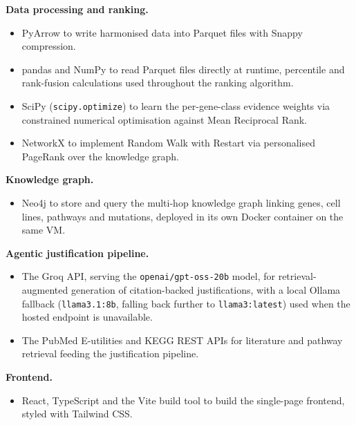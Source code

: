 \documentclass[author={Karen Coutinho, Ishaan Bhalla, Aman Raj, Dixit Kaloorani Malarmannan},
                supervisor={Dr. Daniel D'Andrea},
                degree={MSc},
                title={CellSelector Omics: A Multi-Omics Recommendation System for Cell Line Selection},
                subtitle={},
                type={},
                year={2026}]{dissertation}
\begin{document}
\textbf{Data processing and ranking.}
\begin{itemize}
    \item PyArrow to write harmonised data into Parquet files with Snappy compression.
    \item pandas and NumPy to read Parquet files directly at runtime, percentile and rank-fusion calculations used throughout the ranking algorithm.
    \item SciPy (\texttt{scipy.optimize}) to learn the per-gene-class evidence weights via constrained numerical optimisation against Mean Reciprocal Rank.
    \item NetworkX to implement Random Walk with Restart via personalised PageRank over the knowledge graph.
\end{itemize}

\textbf{Knowledge graph.}
\begin{itemize}
    \item Neo4j to store and query the multi-hop knowledge graph linking genes, cell lines, pathways and mutations, deployed in its own Docker container on the same VM.
\end{itemize}

\textbf{Agentic justification pipeline.}
\begin{itemize}
    \item The Groq API, serving the \texttt{openai/gpt-oss-20b} model, for retrieval-augmented generation of citation-backed justifications, with a local Ollama fallback (\texttt{llama3.1:8b}, falling back further to \texttt{llama3:latest}) used when the hosted endpoint is unavailable.
    \item The PubMed E-utilities and KEGG REST APIs for literature and pathway retrieval feeding the justification pipeline.
\end{itemize}

\textbf{Frontend.}
\begin{itemize}
    \item React, TypeScript and the Vite build tool to build the single-page frontend, styled with Tailwind CSS.
\end{itemize}
\end{document}
